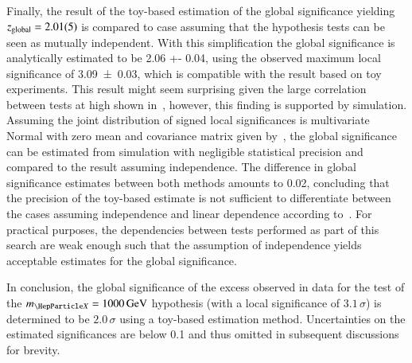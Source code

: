 Finally, the result of the toy-based estimation of the global significance
yielding $z_{\text{global}} = \num{2.01 +- 0.05}$ is compared to case assuming
that the hypothesis tests can be seen as mutually independent. With this
simplification the global significance is analytically estimated to be \num{2.06
  +- 0.04}, using the observed maximum local significance of \num{3.09 +- 0.03},
which is compatible with the result based on toy experiments. This result might
seem surprising given the large correlation between tests at high \mX shown
in~, however, this finding is supported by
simulation. Assuming the joint distribution of signed local significances is
multivariate Normal with zero mean and covariance matrix given
by~, the global significance can be estimated from simulation
with negligible statistical precision and compared to the result assuming
independence. The difference in global significance estimates between both
methods amounts to \num{0.02}, concluding that the precision of the toy-based
estimate is not sufficient to differentiate between the cases assuming
independence and linear dependence according to~. For
practical purposes, the dependencies between tests performed as part of this
search are weak enough such that the assumption of independence yields
acceptable estimates for the global significance.

In conclusion, the global significance of the excess observed in data for the
test of the $\mX = \SI{1000}{\GeV}$ hypothesis (with a local significance of
$3.1\,\sigma$) is determined to be $2.0\,\sigma$ using a toy-based estimation
method. Uncertainties on the estimated significances are below \num{0.1} and
thus omitted in subsequent discussions for brevity.



